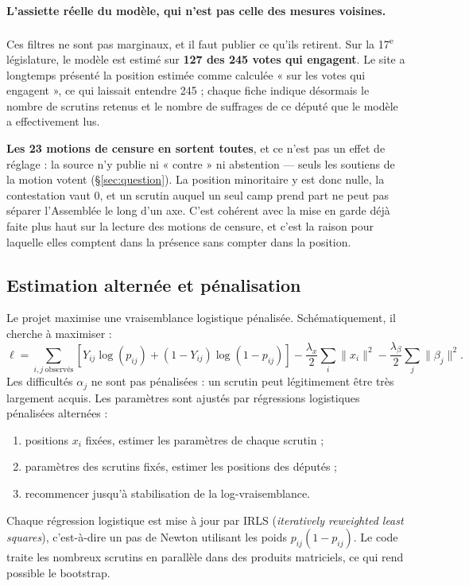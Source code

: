 \documentclass[11pt,a4paper]{article}
\begin{document}
\paragraph{L'assiette réelle du modèle, qui n'est pas celle des mesures
voisines.} Ces filtres ne sont pas marginaux, et il faut publier ce qu'ils
retirent. Sur la 17\textsuperscript{e} législature, le modèle est estimé sur
\textbf{127 des 245 votes qui engagent}. Le site a longtemps présenté la
position estimée comme calculée « sur les votes qui engagent », ce qui laissait
entendre 245 ; chaque fiche indique désormais le nombre de scrutins retenus et
le nombre de suffrages de ce député que le modèle a effectivement lus.

\textbf{Les 23 motions de censure en sortent toutes}, et ce n'est pas un effet
de réglage : la source n'y publie ni « contre » ni abstention — seuls les
soutiens de la motion votent (§\ref{sec:question}). La position minoritaire y
est donc nulle, la contestation vaut 0, et un scrutin auquel un seul camp prend
part ne peut pas séparer l'Assemblée le long d'un axe. C'est cohérent avec la
mise en garde déjà faite plus haut sur la lecture des motions de censure, et
c'est la raison pour laquelle elles comptent dans la présence sans compter dans
la position.

\subsection{Estimation alternée et pénalisation}

Le projet maximise une vraisemblance logistique pénalisée. Schématiquement, il
cherche à maximiser :
\[
 \ell=\sum_{i,j\ \text{observés}}
 \left[Y_{ij}\log(p_{ij})+(1-Y_{ij})\log(1-p_{ij})\right]
 -\frac{\lambda_x}{2}\sum_i\|x_i\|^2
 -\frac{\lambda_\beta}{2}\sum_j\|\beta_j\|^2.
\]
Les difficultés $\alpha_j$ ne sont pas pénalisées : un scrutin peut
légitimement être très largement acquis. Les paramètres sont ajustés par
régressions logistiques pénalisées alternées :

\begin{enumerate}
  \item positions $x_i$ fixées, estimer les paramètres de chaque scrutin ;
  \item paramètres des scrutins fixés, estimer les positions des députés ;
  \item recommencer jusqu'à stabilisation de la log-vraisemblance.
\end{enumerate}

Chaque régression logistique est mise à jour par IRLS (\emph{iteratively
reweighted least squares}), c'est-à-dire un pas de Newton utilisant les poids
$p_{ij}(1-p_{ij})$. Le code traite les nombreux scrutins en parallèle dans des
produits matriciels, ce qui rend possible le bootstrap.
\end{document}

